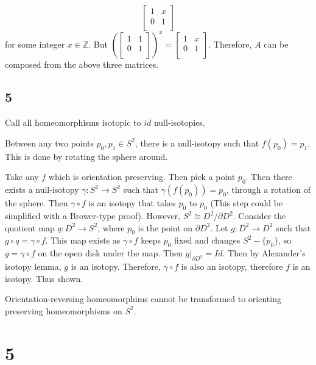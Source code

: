 \documentclass{article}
\theoremstyle{definition}
\numberwithin{theorem}{section}
\numberwithin{equation}{section}
\begin{document}
\begin{equation*}
    \begin{bmatrix}
        1 & x\\
        0 & 1\\
    \end{bmatrix}
\end{equation*}
for some integer $x \in \mathbb{Z}$. But $
\left(\begin{bmatrix}
    1 & 1\\
    0 & 1\\
\end{bmatrix}\right)^x = \begin{bmatrix}
    1 & x\\
    0 & 1\\
\end{bmatrix}$. Therefore, $A$ can be composed from the above three matrices. 

\subsection{5}
Call all homeomorphisms isotopic to $id$ null-isotopies. 

Between any two points $p_0, p_1 \in S^2$, there is a null-isotopy such that $f(p_0) = p_1$. This is done by rotating the sphere around. 

Take any $f$ which is orientation preserving. Then pick a point $p_0$. Then there exists a null-isotopy $\gamma : S^2 \rightarrow S^2$ such that $\gamma(f(p_0)) = p_0$, through a rotation of the sphere. Then $ \gamma \circ f$ is an isotopy that takes $p_0$ to $p_0$ (This step could be simplified with a Brower-type proof). However, $S^2 \cong D^2/{\partial D^2}$. Consider the quotient map $q : D^2 \rightarrow S^2$, where $p_0$ is the point on $\partial D^2$. Let $g : D^2 \rightarrow D^2$ such that $g \circ q = \gamma \circ f$. This map exists as $\gamma \circ f$ keeps $p_0$ fixed and changes $S^2 - \{p_0\}$, so $g = \gamma \circ f$ on the open disk under the map. Then $g|_{\partial D^2} = Id$. Then by Alexander's isotopy lemma, $g$ is an isotopy. Therefore, $\gamma \circ f$ is also an isotopy, therefore $f$ is an isotopy. Thus shown. 

Orientation-reversing homeomorphims cannot be transformed to orienting preserving homeomorphisms on $S^2$. 


\newcommand*{\inter}{\hat{i}}
\newcommand*{\twequiv}{\sim_c}
\section{5}
\end{document}

